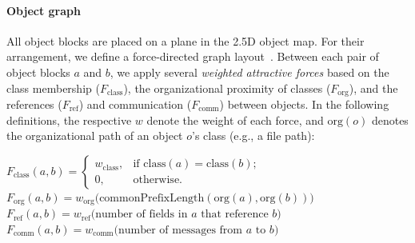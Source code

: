 \paragraph{Object graph}
\label{sec:visualization_approach/mapping/object_graph}

All object blocks are placed on a plane in the 2.5D object map.
For their arrangement, we define a force-directed graph layout~\cite{fruchterman1991graph}.
Between each pair of object blocks $a$ and $b$, we apply several \emph{weighted attractive forces} based on the class membership ($F_\text{class}$), the organizational proximity of classes ($F_\text{org}$), and the references ($F_\text{ref}$) and communication ($F_\text{comm}$) between objects.
In the following definitions, the respective $w$ denote the weight of each force, and $\text{org}(o)$ denotes the organizational path of an object $o$'s class (e.g., a file path):


\begin{algorithm}
	$F_{\text{class}}(a, b) = \begin{cases}w_{\text{class}}, & \text{if $\text{class}(a) = \text{class}(b)$;} \\ 0, & \text{otherwise}.\end{cases}$ \;
	$F_{\text{org}}(a, b) = w_{\text{org}}\bigl(\text{commonPrefixLength}(\text{org}(a), \text{org}(b))\bigr)$ \;
	$F_{\text{ref}}(a, b) = w_{\text{ref}}\bigl(\text{number of fields in $a$ that reference $b$}\bigr)$ \;
	$F_{\text{comm}}(a, b) = w_{\text{comm}}\bigl(\text{number of messages from $a$ to $b$}\bigr)$ \;
\end{algorithm}

